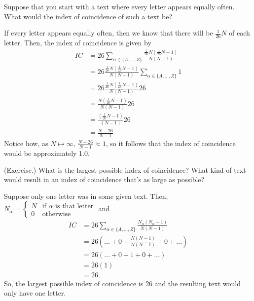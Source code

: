 \documentclass[letterpaper]{article}
\begin{document}
\begin{mdframed}
    Suppose that you start with a text where every letter appears equally often. What would the index of coincidence of such a text be?

    \begin{mdframed}
        If every letter appears equally often, then we know that there will be $\frac{1}{26}N$ of each letter. Then, the index of coincidence is given by 
        \begin{equation*}
            \begin{aligned}
                IC &= 26 \sum_{\alpha \in \{A, \dots, Z\}} \frac{\frac{1}{26}N (\frac{1}{26}N - 1)}{N(N - 1)} \\ 
                    &= 26 \frac{\frac{1}{26}N (\frac{1}{26}N - 1)}{N(N - 1)}  \sum_{\alpha \in \{A, \dots, Z\}} 1 \\ 
                    &= 26 \frac{\frac{1}{26}N (\frac{1}{26}N - 1)}{N(N - 1)} 26 \\ 
                    &= \frac{N (\frac{1}{26}N - 1)}{N(N - 1)} 26 \\ 
                    &=  \frac{(\frac{1}{26}N - 1)}{(N - 1)} 26 \\ 
                    &= \frac{N - 26}{N - 1} 
            \end{aligned}
        \end{equation*}
        Notice how, as $N \mapsto \infty$, $\frac{N - 26}{N - 1} \approx 1$, so it follows that the index of coincidence would be approximately 1.0.
    \end{mdframed}
\end{mdframed}


\begin{mdframed}
    (Exercise.) What is the largest possible index of coincidence? What kind of text would result in an index of coincidence that's as large as possible?

    \begin{mdframed}
        Suppose only one letter was in some given text. Then, $N_\alpha = \begin{cases}
            N & \text{if } \alpha \text{ is that letter} \\ 
            0 & \text{otherwise}
        \end{cases}$ and 
        \begin{equation*}
            \begin{aligned}
                IC &= 26 \sum_{\alpha \in \{A, \hdots, Z\}} \frac{N_\alpha (N_\alpha - 1)}{N(N - 1)} \\
                    &= 26 (\hdots + 0 + \frac{N(N - 1)}{N(N - 1)} + 0 + \hdots) \\ 
                    &= 26 (\hdots + 0 + 1 + 0 + \hdots) \\ 
                    &= 26 (1) \\ 
                    &= 26.
            \end{aligned}
        \end{equation*}
        So, the largest possible index of coincidence is 26 and the resulting text would only have one letter.
    \end{mdframed}
\end{mdframed}
\end{document}
